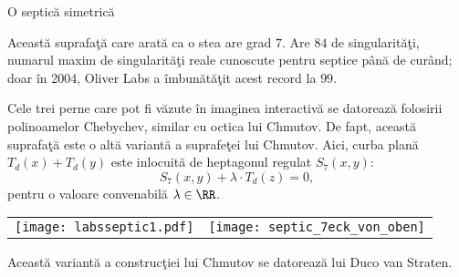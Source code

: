 \begin{surferPage}{O septic\u{a} simetric\u{a}}

     Aceast\u{a} suprafa\c{t}\u{a} care arat\u{a} ca o stea are grad $7$.
     Are $84$ de singularit\u{a}\c{t}i, numarul maxim de singularit\u{a}\c{t}i 
     reale cunoscute pentru septice p\^{a}n\u{a} de cur\^{a}nd; doar 
     \^{i}n 2004, Oliver Labs a \^{i}mbun\u{a}t\u{a}\c{t}it acest record la $99$.
     
  Cele trei perne care pot fi v\u{a}zute \^{i}n imaginea interactiv\u{a} 
    se datoreaz\u{a} folosirii polinoamelor Chebychev, similar cu octica lui Chmutov.
    De fapt, aceast\u{a} suprafa\c{t}\u{a} este o alt\u{a} variant\u{a} a suprafe\c{t}ei lui Chmutov. Aici,
    curba plan\u{a} $T_d(x)+T_d(y)$ este inlocuit\u{a} de heptagonul regulat $S_7(x,y)$: 
   \[S_7(x,y) + \lambda \cdot T_d(z) = 0,\]
    pentru o valoare convenabil\u{a} $\lambda\in\RR$. 
      \vspace*{-0.3em}
    \begin{center}
      \begin{tabular}{c@{\qquad}c}
        \texttt{[image: labsseptic1.pdf]}
        &
        \texttt{[image: septic\_7eck\_von\_oben]}
      \end{tabular}
    \end{center}
    \vspace*{-0.3em}   
   Aceast\u{a} variant\u{a} a construc\c{t}iei lui Chmutov se datoreaz\u{a} lui Duco van Straten.

\end{surferPage}
